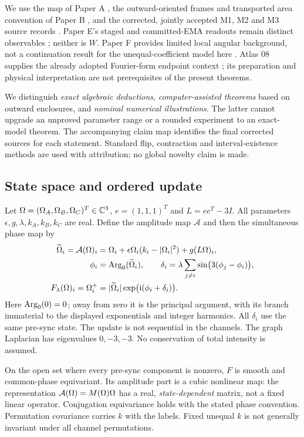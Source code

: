 \documentclass[11pt,a4paper]{article}
\begin{document}
We use the map of Paper A \cite{PA}, the outward-oriented frames and transported area convention of Paper B \cite{PB}, and the corrected, jointly accepted M1, M2 and M3 source records \cite{M1,M2,M3}. Paper E's staged and committed-EMA readouts remain distinct observables \cite{PE}; neither is $W$. Paper F provides limited local angular background, not a continuation result for the unequal-coefficient model here \cite{PF}. Atlas 08 supplies the already adopted Fourier-form endpoint context \cite{Atlas}; its preparation and physical interpretation are not prerequisites of the present theorems.

We distinguish \emph{exact algebraic deductions}, \emph{computer-assisted theorems} based on outward enclosures, and \emph{nominal numerical illustrations}. The latter cannot upgrade an unproved parameter range or a rounded experiment to an exact-model theorem. The accompanying claim map identifies the final corrected sources for each statement. Standard flip, contraction and interval-existence methods are used with attribution; no global novelty claim is made.

\subsection{State space and ordered update}
Let $\Omega=(\Omega_A,\Omega_B,\Omega_C)^T\in\mathbb C^3$, $e=(1,1,1)^T$ and $L=ee^T-3I$. All parameters $\epsilon,g,\lambda,k_A,k_B,k_C$ are real. Define the amplitude map $\mathcal A$ and then the simultaneous phase map by
\begin{align}
 \widetilde{\Omega}_i=\mathcal A(\Omega)_i
 &=\Omega_i+\epsilon\Omega_i(k_i-|\Omega_i|^2)+g(L\Omega)_i,\label{eq:amp}\\
 \phi_i&=\operatorname{Arg}_0(\widetilde{\Omega}_i),\qquad
 \delta_i=\lambda\sum_{j\ne i}\sin\bigl(3(\phi_j-\phi_i)\bigr),\label{eq:phase}\\
 F_\lambda(\Omega)_i=\Omega_i^+
 &=|\widetilde{\Omega}_i|\exp\bigl(\mathrm i(\phi_i+\delta_i)\bigr).\label{eq:full}
\end{align}
Here $\operatorname{Arg}_0(0)=0$; away from zero it is the principal argument, with its branch immaterial to the displayed exponentials and integer harmonics. All $\delta_i$ use the same pre-sync state. The update is not sequential in the channels. The graph Laplacian has eigenvalues $0,-3,-3$. No conservation of total intensity is assumed.

On the open set where every pre-sync component is nonzero, $F$ is smooth and common-phase equivariant. Its amplitude part is a cubic nonlinear map: the representation $\mathcal A(\Omega)=M(\Omega)\Omega$ has a real, \emph{state-dependent} matrix, not a fixed linear operator. Conjugation equivariance holds with the stated phase convention. Permutation covariance carries $k$ with the labels. Fixed unequal $k$ is not generally invariant under all channel permutations.
\end{document}
